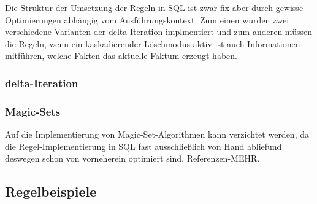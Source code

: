 Die Struktur der Umsetzung der Regeln in SQL ist zwar fix aber durch gewisse Optimierungen abhängig vom Ausführungskontext. Zum einen wurden zwei verschiedene Varianten der delta-Iteration implmentiert und zum anderen müssen die Regeln, wenn ein kaskadierender Löschmodus aktiv ist auch Informationen mitführen, welche Fakten das aktuelle Faktum erzeugt haben.

\subsubsection{delta-Iteration}


\subsubsection{Magic-Sets}
Auf die Implementierung von Magic-Set-Algorithmen kann verzichtet werden, da die Regel-Implementierung in SQL fast ausschließlich von Hand abliefund deswegen schon von vorneherein optimiert sind.
Referenzen-MEHR.


\subsection{Regelbeispiele}

